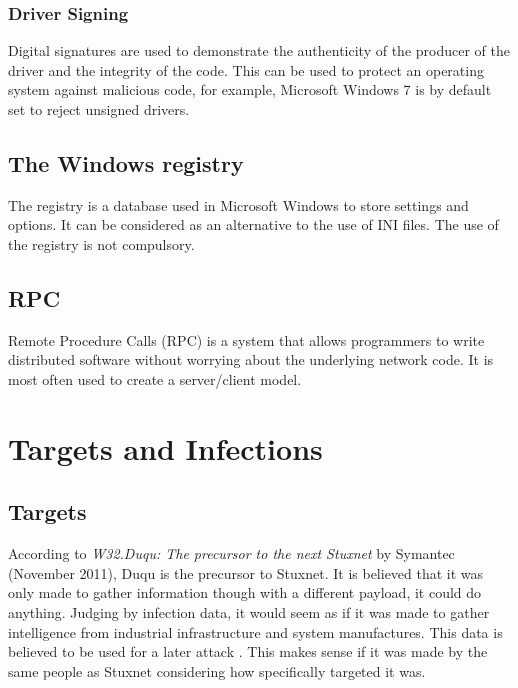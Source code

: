 \documentclass[11pt,english,a4paper]{report}
\begin{document}
\subsection{Driver Signing} \label{DRIVER_SIGN}
Digital signatures are used to demonstrate the authenticity of the producer of the driver and the integrity of the code. This can be used to protect an operating system against malicious code, for example, Microsoft Windows 7 is by default set to reject unsigned drivers.  

\section{The Windows registry}
The registry is a database used in Microsoft Windows to store settings and options. It can be considered as an alternative to the use of INI files. The use of the registry is not compulsory.

\section{RPC}
Remote Procedure Calls (RPC) is a system that allows programmers to write distributed software without worrying about the underlying network code. It is most often used to create a server/client model. \cite{MSRPC}

\chapter{Targets and Infections}
\section{Targets}
According to \textit{W32.Duqu: The precursor to the next Stuxnet}\cite{DUQU_SYMANTEC} by Symantec (November 2011), Duqu is the precursor to Stuxnet. It is believed that it was only made to gather information though with a different payload, it could do anything. Judging by infection data, it would seem as if it was made to gather intelligence from industrial infrastructure and system manufactures. This data is believed to be used for a later attack \cite{DUQU_SYMANTEC}. This makes sense if it was made by the same people as Stuxnet considering how specifically targeted it was. 
\end{document}
